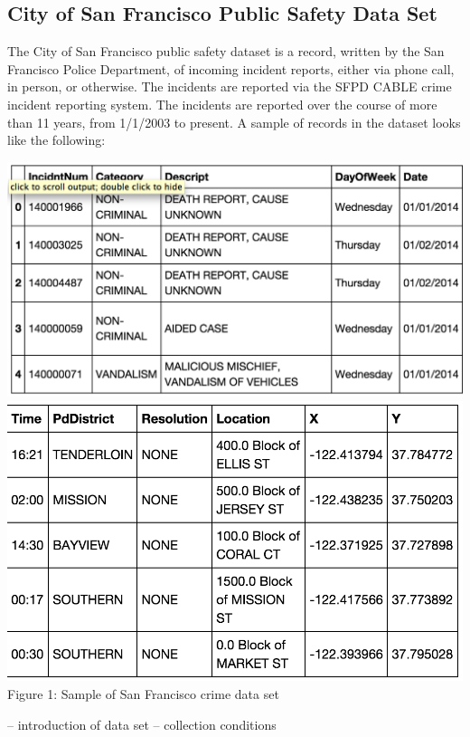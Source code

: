 \documentclass{article}
\begin{document}
\subsection{City of San Francisco Public Safety Data Set}

The City of San Francisco public safety dataset is a record, written by the
San Francisco Police Department, of incoming incident reports, either via
phone call, in person, or otherwise. The incidents are reported via the
SFPD CABLE crime incident reporting system. The incidents are reported over
the course of more than 11 years, from 1/1/2003 to present. A sample of
records in the dataset looks like the following:

\begin{center}
  \includegraphics[scale=0.5]{sf_city_sample_1.png} \\
  \includegraphics[scale=0.5]{sf_city_sample_2.png} \\
  Figure 1: Sample of San Francisco crime data set
\end{center}

-- introduction of data set
-- collection conditions
\end{document}
